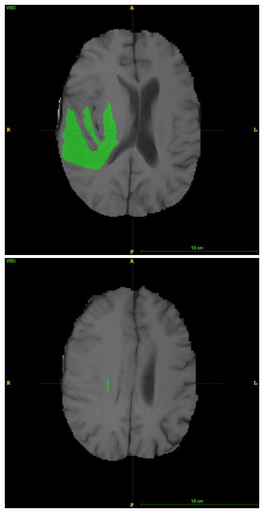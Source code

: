 \documentclass[12pt,a4paper,twoside,openright]{report}
\begin{document}
\begin{figure}[h]
	\includegraphics[scale=0.1]{expert_segmentation_109}
	\includegraphics[scale=0.1]{expert_segmentation_119}

\end{figure}
\end{document}

